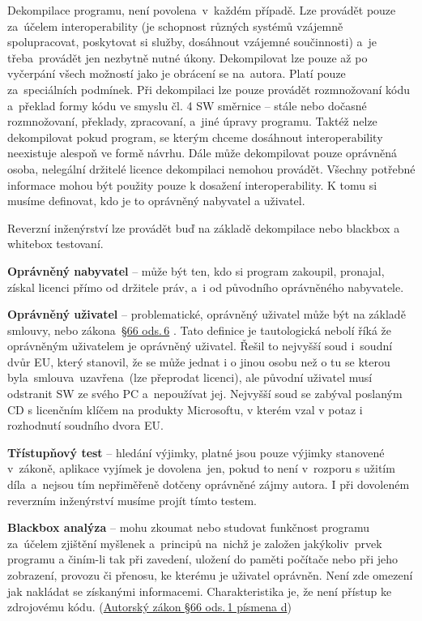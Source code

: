 Dekompilace programu, není povolena~v~každém případě. Lze provádět pouze za~účelem interoperability (je schopnost různých systémů vzájemně spolupracovat, poskytovat si služby, dosáhnout vzájemné součinnosti) a~je třeba~provádět jen nezbytně nutné úkony. Dekompilovat lze pouze až po vyčerpání všech možností jako je obrácení se na~autora. Platí pouze za~speciálních podmínek. Při dekompilaci lze pouze provádět rozmnožovaní kódu a~překlad formy kódu ve smyslu čl. 4 SW směrnice -- stále nebo dočasné rozmnožovaní, překlady, zpracovaní, a~jiné úpravy programu. Taktéž nelze dekompilovat pokud program, se kterým chceme dosáhnout interoperability neexistuje alespoň ve formě návrhu. Dále může dekompilovat pouze oprávněná osoba, nelegální držitelé licence dekompilaci nemohou provádět. Všechny potřebné informace mohou být použity pouze k dosažení interoperability. K tomu si musíme definovat, kdo je to oprávněný nabyvatel a uživatel.

Reverzní inženýrství lze provádět buď na základě dekompilace nebo blackbox a whitebox testovaní. 

\textbf{Oprávněný nabyvatel} -- může být ten, kdo si program zakoupil, pronajal, získal licenci přímo od držitele práv, a~i od původního oprávněného nabyvatele.

\textbf{Oprávněný uživatel} -- problematické, oprávněný uživatel může být na základě smlouvy, nebo zákona~\href{https://www.zakonyprolidi.cz/cs/2000-121#p66-6}{§66 ods.\,6} . Tato definice je tautologická nebolí říká že oprávněným uživatelem je oprávněný uživatel. Řešil to nejvyšší soud i~soudní dvůr EU, který stanovil, že se může jednat i o jinou osobu než o tu se kterou byla~smlouva~uzavřena~(lze přeprodat licenci), ale původní uživatel musí odstranit SW ze svého PC a~nepoužívat jej. Nejvyšší soud se zabýval poslaným CD s licenčním klíčem na produkty Microsoftu, v kterém vzal v potaz i rozhodnutí soudního dvora EU.

\textbf{Třístupňový test} -- hledání výjimky, platné jsou pouze výjimky stanovené v~zákoně, aplikace vyjímek je dovolena~jen, pokud to není v~rozporu s užitím díla~a~nejsou tím nepřiměřeně dotčeny oprávněné zájmy autora. I při dovoleném reverzním inženýrství musíme projít tímto testem.

\textbf{Blackbox analýza} -- mohu zkoumat nebo studovat funkčnost programu za~účelem zjištění myšlenek a~principů na~nichž je založen jakýkoliv~prvek programu a činím-li tak při zavedení, uložení do paměti počítače nebo při jeho zobrazení, provozu či přenosu, ke kterému je uživatel oprávněn. Není zde omezení jak nakládat se získanými informacemi. Charakteristika je, že není přístup ke zdrojovému kódu.  (\href{https://www.zakonyprolidi.cz/cs/2000-121#p66-1-d}{Autorský zákon §66 ods.\,1 písmena d})

